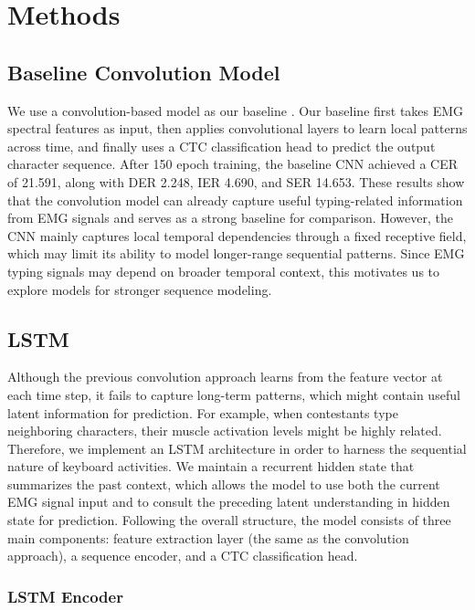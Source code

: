 \documentclass{article}
\begin{document}
\section{Methods}

\subsection{Baseline Convolution Model}


We use a convolution-based model as our baseline \cite{vaswani2017attention}. Our baseline first takes EMG spectral features as input, then applies convolutional layers to learn local patterns across time, and finally uses a CTC classification head to predict the output character sequence. After 150 epoch training, the baseline CNN achieved a CER of 21.591, along with DER 2.248, IER 4.690, and SER 14.653. These results show that the convolution model can already capture useful typing-related information from EMG signals and serves as a strong baseline for comparison. However, the CNN mainly captures local temporal dependencies through a fixed receptive field, which may limit its ability to model longer-range sequential patterns. Since EMG typing signals may depend on broader temporal context, this motivates us to explore models for stronger sequence modeling.

\subsection{LSTM}

Although the previous convolution approach learns from the feature vector at each time step, it fails to capture long-term patterns, which might contain useful latent information for prediction. For example, when contestants type neighboring characters, their muscle activation levels might be highly related. Therefore, we implement an LSTM architecture in order to harness the sequential nature of keyboard activities. We maintain a recurrent hidden state that summarizes the past context, which allows the model to use both the current EMG signal input and to consult the preceding latent understanding in hidden state for prediction. Following the overall structure, the model consists of three main components: feature extraction layer (the same as the convolution approach), a sequence encoder, and a CTC classification head.  

\subsubsection{LSTM Encoder}
\end{document}
